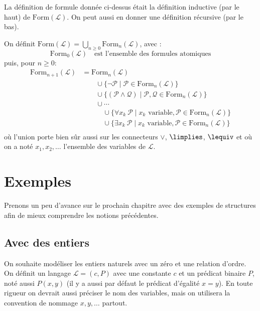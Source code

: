 \documentclass[11pt,class=report,crop=false]{standalone}
\begin{document}
La définition de formule donnée ci-dessus était la définition inductive (\og{}par le haut\fg{}) de $\text{Form}(\mathcal{L})$. On peut aussi en donner une définition récursive (\og{}par le bas\fg{}).

On définit $\text{Form}(\mathcal{L}) = \bigcup_{n\ge0} \text{Form}_n(\mathcal{L})$, avec :
\[
\text{Form}_0(\mathcal{L}) \quad \text{est l'ensemble des formules atomiques}
\]
puis, pour $n \ge 0$:
\begin{align*}
	\text{Form}_{n+1}(\mathcal{L})
	&= \text{Form}_n(\mathcal{L})\\
	& \quad\quad \cup \big\{ \lnot \mathcal{P} \mid \mathcal{P} \in \text{Form}_n(\mathcal{L}) \big\}\\
	& \quad\quad  \cup \big\{ (\mathcal{P} \land \mathcal{Q}) \mid \mathcal{P}, \mathcal{Q} \in \text{Form}_n(\mathcal{L}) \big\}\\
	&\quad\quad \cup \cdots\\
	&\quad\quad\quad \cup \big\{ \forall x_k \  \mathcal{P} \mid x_k \text{ variable}, \mathcal{P} \in \text{Form}_n(\mathcal{L}) \big\} \\
	&\quad\quad\quad \cup \big\{ \exists x_k \ \mathcal{P} \mid x_k \text{ variable},\mathcal{P} \in \text{Form}_n(\mathcal{L}) \big\} \\	
\end{align*}
où l'union porte bien sûr aussi sur les connecteurs $\lor$, $\limplies$, $\lequiv$ et où on a noté $x_1, x_2, \ldots$ l'ensemble des variables de $\mathcal{L}$.




\section{Exemples}

Prenons un peu d'avance sur le prochain chapitre avec des exemples de structures afin de mieux comprendre les notions précédentes.


\subsection{Avec des entiers}

On souhaite modéliser les entiers naturels avec un zéro et une relation d'ordre.
On définit un langage $\mathcal{L} = (c, P)$ avec une constante $c$ et un prédicat binaire $P$, noté aussi $P(x,y)$ (il y a aussi par défaut le prédicat d'égalité $x=y$).
En toute rigueur on devrait aussi préciser le nom des variables, mais on utilisera la convention de nommage $x, y, \ldots$ partout.
\end{document}
